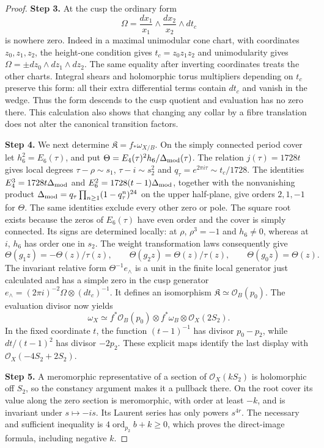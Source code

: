 \begin{proof}
\par\smallskip\noindent\textbf{Step 3.} At the cusp the ordinary form
\[
 \Omega=\frac{dx_1}{x_1}\wedge\frac{dx_2}{x_2}\wedge dt_c
\]
is nowhere zero. Indeed in a maximal unimodular cone chart, with coordinates $z_0,z_1,z_2$, the height-one condition gives $t_c=z_0z_1z_2$ and unimodularity gives $\Omega=\pm dz_0\wedge dz_1\wedge dz_2$. The same equality after inverting coordinates treats the other charts. Integral shears and holomorphic torus multipliers depending on $t_c$ preserve this form: all their extra differential terms contain $dt_c$ and vanish in the wedge. Thus the form descends to the cusp quotient and evaluation has no zero there. This calculation also shows that changing any collar by a fibre translation does not alter the canonical transition factors.

\par\smallskip\noindent\textbf{Step 4.} We next determine $\mathfrak K=f_*\omega_{X/B}$. On the simply connected period cover let $h_6^2=E_6(\tau)$, and put $\Theta=E_4(\tau)^2h_6/\Delta_{\rm mod}(\tau)$. The relation $j(\tau)=1728t$ gives local degrees $\tau-\rho\sim s_1$, $\tau-i\sim s_2^2$ and $q_\tau=e^{2\pi i\tau}\sim t_c/1728$. The identities $E_4^3=1728t\Delta_{\rm mod}$ and $E_6^2=1728(t-1)\Delta_{\rm mod}$, together with the nonvanishing product $\Delta_{\rm mod}=q_\tau\prod_{n\ge1}(1-q_\tau^n)^{24}$ on the upper half-plane, give orders $2,1,-1$ for $\Theta$. The same identities exclude every other zero or pole. The square root exists because the zeros of $E_6(\tau)$ have even order and the cover is simply connected. Its signs are determined locally: at $\rho$, $\rho^3=-1$ and $h_6\ne0$, whereas at $i$, $h_6$ has order one in $s_2$. The weight transformation laws consequently give
\[
 \Theta(g_1z)=-\Theta(z)/\tau(z),\qquad
 \Theta(g_2z)=\Theta(z)/\tau(z),\qquad \Theta(g_0z)=\Theta(z).
\]
The invariant relative form $\Theta^{-1}e_\wedge$ is a unit in the finite local generator just calculated and has a simple zero in the cusp generator $e_\wedge=(2\pi i)^{-2}\Omega\otimes(dt_c)^{-1}$. It defines an isomorphism $\mathfrak K\simeq\mathcal O_B(p_0)$. The evaluation divisor now yields
\[
 \omega_X\simeq f^*\mathcal O_B(p_0)\otimes f^*\omega_B\otimes\mathcal O_X(2S_2).
\]
In the fixed coordinate $t$, the function $(t-1)^{-1}$ has divisor $p_0-p_2$, while $dt/(t-1)^2$ has divisor $-2p_2$. These explicit maps identify the last display with $\mathcal O_X(-4S_2+2S_2)$.

\par\smallskip\noindent\textbf{Step 5.} A meromorphic representative of a section of $\mathcal O_X(kS_2)$ is holomorphic off $S_2$, so the constancy argument makes it a pullback there. On the root cover its value along the zero section is meromorphic, with order at least $-k$, and is invariant under $s\mapsto-is$. Its Laurent series has only powers $s^{4r}$. The necessary and sufficient inequality is $4\operatorname{ord}_{p_2}b+k\ge0$, which proves the direct-image formula, including negative $k$.


\end{proof}
